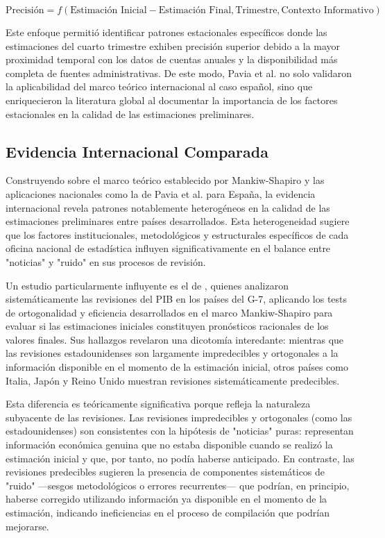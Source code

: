\documentclass{article}
\begin{document}
\begin{equation}
\text{Precisión} = f(\text{Estimación Inicial} - \text{Estimación Final}, \text{Trimestre}, \text{Contexto Informativo})
\end{equation}

Este enfoque permitió identificar patrones estacionales específicos donde las estimaciones del cuarto trimestre exhiben precisión superior debido a la mayor proximidad temporal con los datos de cuentas anuales y la disponibilidad más completa de fuentes administrativas. De este modo, Pavia et al. no solo validaron la aplicabilidad del marco teórico internacional al caso español, sino que enriquecieron la literatura global al documentar la importancia de los factores estacionales en la calidad de las estimaciones preliminares.


\subsection{Evidencia Internacional Comparada}

Construyendo sobre el marco teórico establecido por Mankiw-Shapiro y las aplicaciones nacionales como la de Pavia et al. para España, la evidencia internacional revela patrones notablemente heterogéneos en la calidad de las estimaciones preliminares entre países desarrollados. Esta heterogeneidad sugiere que los factores institucionales, metodológicos y estructurales específicos de cada oficina nacional de estadística influyen significativamente en el balance entre "noticias" y "ruido" en sus procesos de revisión.

Un estudio particularmente influyente es el de \citet{faust2005}, quienes analizaron sistemáticamente las revisiones del PIB en los países del G-7, aplicando los tests de ortogonalidad y eficiencia desarrollados en el marco Mankiw-Shapiro para evaluar si las estimaciones iniciales constituyen pronósticos racionales de los valores finales. Sus hallazgos revelaron una dicotomía interedante: mientras que las revisiones estadounidenses son largamente impredecibles y ortogonales a la información disponible en el momento de la estimación inicial, otros países como Italia, Japón y Reino Unido muestran revisiones sistemáticamente predecibles.

Esta diferencia es teóricamente significativa porque refleja la naturaleza subyacente de las revisiones. Las revisiones impredecibles y ortogonales (como las estadounidenses) son consistentes con la hipótesis de "noticias" puras: representan información económica genuina que no estaba disponible cuando se realizó la estimación inicial y que, por tanto, no podía haberse anticipado. En contraste, las revisiones predecibles sugieren la presencia de componentes sistemáticos de "ruido" —sesgos metodológicos o errores recurrentes— que podrían, en principio, haberse corregido utilizando información ya disponible en el momento de la estimación, indicando ineficiencias en el proceso de compilación que podrían mejorarse.
\end{document}
